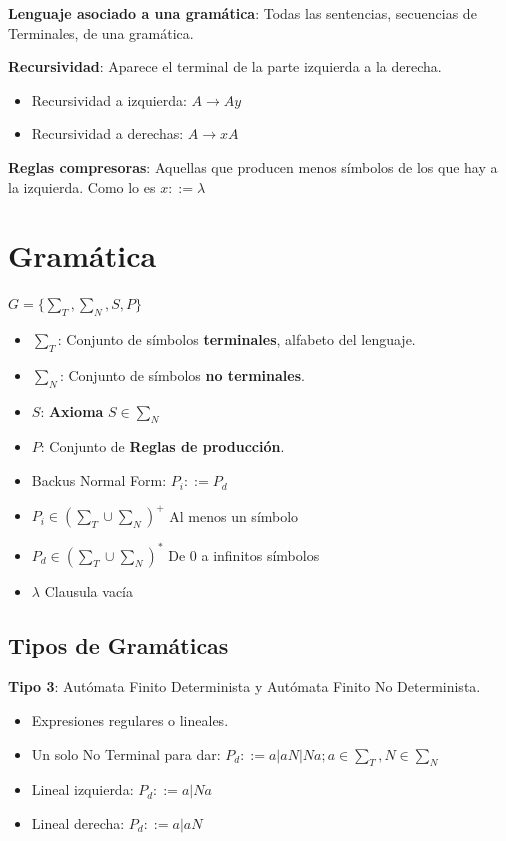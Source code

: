 \documentclass[12pt, twoside, openright]{report} %
\begin{document}
\textbf{Lenguaje asociado a una gramática}: Todas las sentencias, secuencias de Terminales, de una gramática.

\textbf{Recursividad}: Aparece el terminal de la parte izquierda a la derecha.

\begin{itemize}
	\item Recursividad a izquierda: $A \rightarrow Ay$
	\item Recursividad a derechas: $A \rightarrow xA$
\end{itemize}

\textbf{Reglas compresoras}: Aquellas que producen menos símbolos de los
que hay a la izquierda. Como lo es \(x::= \lambda\)

\section{Gramática}

\(G=\{ \sum_T, \sum_N, S, P\}\)

\begin{itemize}
	\item \(\sum_T\): Conjunto de símbolos \textbf{terminales}, alfabeto del
	      lenguaje.
	\item \(\sum_N\): Conjunto de símbolos \textbf{no terminales}.
	\item \(S\): \textbf{Axioma} \(S \in \sum_N\)
	\item \(P\): Conjunto de \textbf{Reglas de producción}.
	\item Backus Normal Form: \(P_i ::= P_d\)
	\item \(P_i \in (\sum_T \cup \sum_N)^+\) Al menos un símbolo
	\item \(P_d \in (\sum_T \cup \sum_N)^*\) De 0 a infinitos símbolos
	\item \(\lambda\) Clausula vacía
\end{itemize}


\subsection{Tipos de Gramáticas}

\textbf{Tipo 3}: Autómata Finito Determinista y Autómata Finito No
Determinista.

\begin{itemize}
	\item Expresiones regulares o lineales.
	\item Un solo No Terminal para dar:
	      \(P_d ::= a | aN | Na; a \in \sum_T, N \in \sum_N\)
	\item Lineal izquierda: \(P_d ::= a | Na\)
	\item Lineal derecha: \(P_d ::= a | aN\)
\end{itemize}
\end{document}
